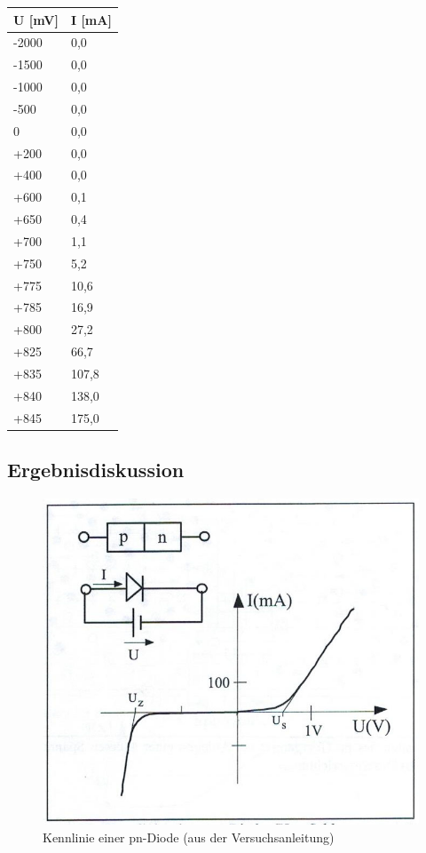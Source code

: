 \documentclass{scrartcl}
\begin{document}
\begin{table}[H]
\begin{center}
\begin{tabular}{l|l}
U [mV]   &   I [mA] \\
\hline
-2000   &     0,0 \\
-1500   &     0,0 \\
-1000   &     0,0 \\
-500    &     0,0 \\
    0   &     0,0 \\
+200    &     0,0 \\
+400    &     0,0 \\
+600    &     0,1 \\
+650    &     0,4 \\
+700    &     1,1 \\
+750    &     5,2 \\
+775    &    10,6 \\
+785    &    16,9 \\
+800    &    27,2 \\
+825    &    66,7 \\
+835    &   107,8 \\
+840    &   138,0 \\
+845    &   175,0
\end{tabular}
\end{center}
\label{tab:Diode}
\end{table}

\subsection{Ergebnisdiskussion}

\begin{figure}[H]
  \centering
    \includegraphics[scale=0.75]{Kennlinie_Diode.JPG}
  \caption{Kennlinie einer pn-Diode (aus der Versuchsanleitung)}
  \label{fig:Kennlinie_Diode}
\end{figure}
\end{document}
